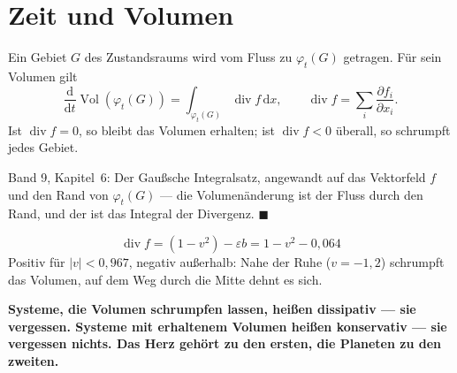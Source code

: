\section{Zeit und Volumen}

\begin{merksatz}
Ein Gebiet $G$ des Zustandsraums wird vom Fluss zu $\varphi_t(G)$ getragen. Für sein Volumen gilt
\[ \frac{\mathrm d}{\mathrm dt}\operatorname{Vol}(\varphi_t(G)) = \int_{\varphi_t(G)} \operatorname{div} f\,\mathrm dx, \qquad \operatorname{div} f = \sum_i \frac{\partial f_i}{\partial x_i} . \]
Ist $\operatorname{div} f = 0$, so bleibt das Volumen erhalten; ist $\operatorname{div} f < 0$ überall, so schrumpft jedes Gebiet.

Band 9, Kapitel~6: Der Gaußsche Integralsatz, angewandt auf das Vektorfeld $f$ und den Rand von $\varphi_t(G)$ --- die Volumenänderung ist der Fluss durch den Rand, und der ist das Integral der Divergenz. $\blacksquare$

\[ \operatorname{div} f = (1 - v^{2}) - \varepsilon b = 1 - v^{2} - 0{,}064 \]
Positiv für $|v| < 0{,}967$, negativ außerhalb: Nahe der Ruhe ($v = -1{,}2$) schrumpft das Volumen, auf dem Weg durch die Mitte dehnt es sich.

\begin{center}
\begin{minipage}{0.9\textwidth}
\textbf{Systeme, die Volumen schrumpfen lassen, heißen dissipativ --- sie vergessen. Systeme mit erhaltenem Volumen heißen konservativ --- sie vergessen nichts. Das Herz gehört zu den ersten, die Planeten zu den zweiten.}
\end{minipage}
\end{center}

\begin{center}
\begin{minipage}{0.88\textwidth}
\end{minipage}
\end{center}
\end{merksatz}


